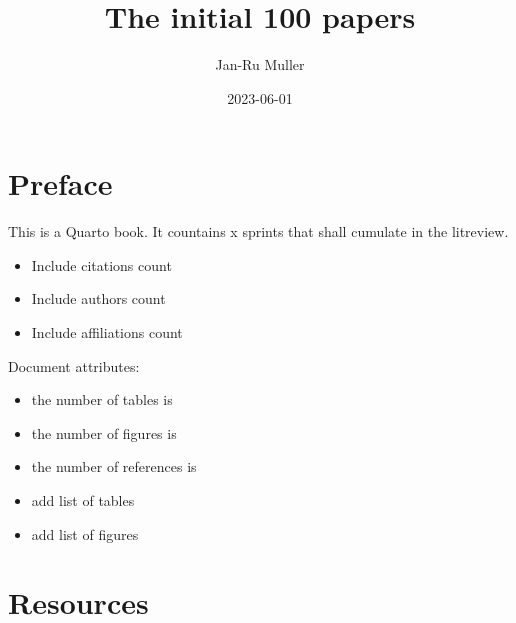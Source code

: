 \documentclass[
  letterpaper,
  DIV=11,
  numbers=noendperiod]{scrreprt}
\title{The initial 100 papers}
\author{Jan-Ru Muller}
\date{2023-06-01}
\providecommand{\tightlist}{%
  \setlength{\itemsep}{0pt}\setlength{\parskip}{0pt}}\usepackage{longtable,booktabs,array}
\renewcommand*\contentsname{Table of contents}
\newcommand\contentsname{Table of contents}
\begin{document}
\maketitle
\ifdefined\Shaded\renewenvironment{Shaded}{\begin{tcolorbox}[boxrule=0pt, sharp corners, frame hidden, interior hidden, borderline west={3pt}{0pt}{shadecolor}, enhanced, breakable]}{\end{tcolorbox}}\fi

\renewcommand*\contentsname{Table of contents}
{
\hypersetup{linkcolor=}
\setcounter{tocdepth}{2}
\tableofcontents
}

\hypertarget{preface}{%
\chapter*{Preface}\label{preface}}


This is a Quarto book. It countains x sprints that shall cumulate in the
litreview.

\begin{itemize}
\tightlist
\item
  Include citations count
\item
  Include authors count
\item
  Include affiliations count
\end{itemize}

Document attributes:

\begin{itemize}
\item
  the number of tables is 
\item
  the number of figures is 
\item
  the number of references is 
\item
  add list of tables
\item
  add list of figures
\end{itemize}


\hypertarget{resources}{%
\chapter*{Resources}\label{resources}}

\end{document}
